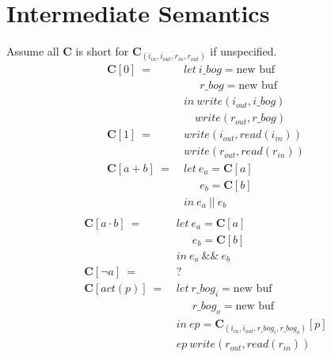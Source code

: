 \documentclass[12pt, letterpaper]{article}
\begin{document}
\section{Intermediate Semantics}
Assume all $\mathbf{C}$ is short for $\mathbf{C}_{(i_{in},i_{out},r_{in},r_{out})}$ if unspecified.
 {\fontsize{12pt}{14pt}\selectfont
     \begin{align*}
         \mathbf{C}[0]\ 
             =\ &
             let\ i\_bog = \text{new buf}\\
             &\quad\ \ r\_bog = \text{new buf}\\
             &in\ write(i_{out}, i\_bog)\\
             &\quad  write(r_{out}, r\_bog)\\
         \mathbf{C}[1]\ 
             =\ &
             write(i_{out}, read(i_{in}))\\
             &write(r_{out}, read(r_{in}))
             \\ %
         \mathbf{C}[a + b]\ 
             =\ &
             let\ e_a = \mathbf{C}[a]\\
             &\quad\ \ e_b = \mathbf{C}[b]\\
             &in\ e_a\ ||\ e_b\\
    \end{align*}
    \begin{align*}
         \mathbf{C}[a \cdot b]\ 
             =\ &
             let\ e_a = \mathbf{C}[a]\\
             &\quad\ \ e_b = \mathbf{C}[b]\\
             &in\ e_a\ \&\&\ e_b\\
         \mathbf{C}[\neg a]\ 
             =\ &
             ?
             \\%
         \mathbf{C}[act(p)]\ 
             =\ &
             let\ r\_bog_i = \text{new buf}\\
             &\quad\ \ r\_bog_o = \text{new buf}\\
             &in\ ep = \mathbf{C}_{(i_{in}, i_{out}, r\_bog_i, r\_bog_o)}[p]\\
             &ep\ write(r_{out}, read(r_{in}))

\end{align*}}
\end{document}
